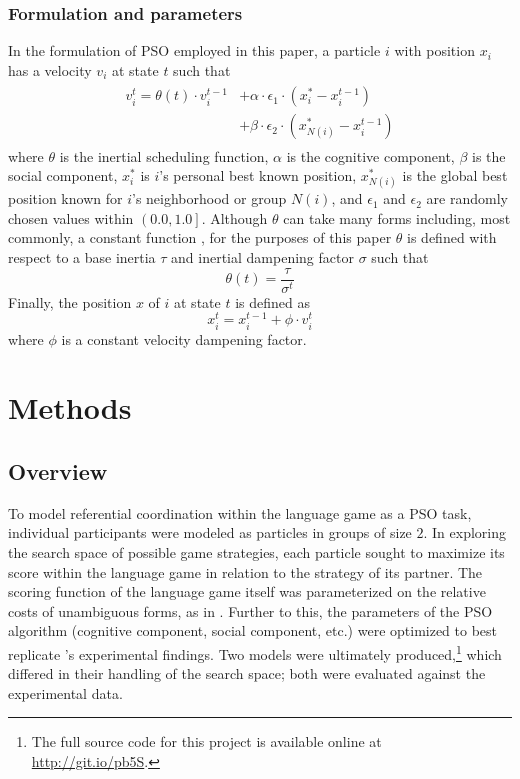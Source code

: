 \documentclass[11pt]{article}
\begin{document}
\subsubsection{Formulation and parameters}
\label{sec:2.2.3}
In the formulation of PSO employed in this paper, a particle $i$ with position $x_i$ has a velocity $v_i$ at state $t$ such that 
\begin{multline}
\begin{split}
v_i^t = \theta(t) \cdot v_i^{t-1} & + \alpha \cdot \epsilon_1 \cdot (x_i^* - x_i^{t-1}) \\
                                  & + \beta \cdot \epsilon_2 \cdot (x_{N(i)}^* - x_i^{t-1})
\end{split}
\end{multline}
where $\theta$ is the inertial scheduling function, $\alpha$ is the cognitive component, $\beta$ is the social component, $x_i^*$ is $i$'s personal best known position, $x_{N(i)}^*$ is the global best position known for $i$'s neighborhood or group $N(i)$, and $\epsilon_1$ and $\epsilon_2$ are randomly chosen values within $\left(0.0, 1.0\right]$. Although $\theta$ can take many forms including, most commonly, a constant function \citep{yang2014}, for the purposes of this paper $\theta$ is defined with respect to a base inertia $\tau$ and inertial dampening factor $\sigma$ such that
\begin{equation}
\theta(t) = \frac{\tau}{\sigma^t} 
\end{equation}
Finally, the position $x$ of $i$ at state $t$ is defined as
\begin{equation}
x_i^t = x_i^{t-1} + \phi \cdot v_i^t 
\end{equation}
where $\phi$ is a constant velocity dampening factor.

\section{Methods}

\subsection{Overview}

To model referential coordination within the \citeauthor{rohde2012} language game as a PSO task, individual participants were modeled as particles in groups of size $2$. In exploring the search space of possible game strategies, each particle sought to maximize its score within the language game in relation to the strategy of its partner. The scoring function of the language game itself was parameterized on the relative costs of unambiguous forms, as in \citeauthor{rohde2012}. Further to this, the parameters of the PSO algorithm (cognitive component, social component, etc.) were optimized to best replicate \citeauthor{rohde2012}'s experimental findings. Two models were ultimately produced,\footnote{The full source code for this project is available online at \url{http://git.io/pb5S}.} which differed in their handling of the search space; both were evaluated against the experimental data.
\end{document}
